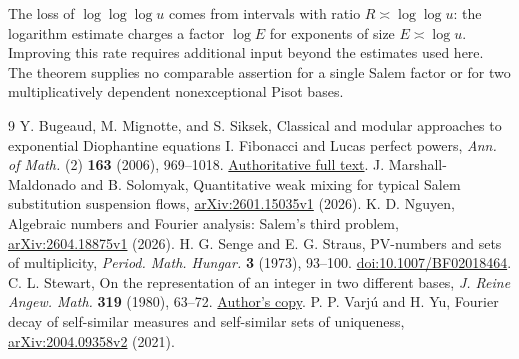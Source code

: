 \documentclass[11pt]{article}
\begin{document}
The loss of $\log\log\log u$ comes from intervals with ratio
$R\asymp\log\log u$: the logarithm estimate charges a factor
$\log E$ for exponents of size $E\asymp\log u$.
Improving this rate requires additional input beyond the estimates used
here. The theorem supplies no comparable assertion for a single Salem
factor or for two multiplicatively dependent nonexceptional Pisot bases.

\begin{thebibliography}{9}
 Y. Bugeaud, M. Mignotte, and S. Siksek,
Classical and modular approaches to exponential Diophantine equations I.
Fibonacci and Lucas perfect powers,
\emph{Ann. of Math.} (2) \textbf{163} (2006), 969--1018.
\href{https://annals.math.princeton.edu/wp-content/uploads/annals-v163-n3-p05.pdf}{Authoritative full text}.
 J. Marshall-Maldonado and B. Solomyak,
Quantitative weak mixing for typical Salem substitution suspension flows,
\href{https://arxiv.org/abs/2601.15035v1}{arXiv:2601.15035v1} (2026).
 K. D. Nguyen,
Algebraic numbers and Fourier analysis: Salem's third problem,
\href{https://arxiv.org/abs/2604.18875v1}{arXiv:2604.18875v1} (2026).
 H. G. Senge and E. G. Straus,
PV-numbers and sets of multiplicity,
\emph{Period. Math. Hungar.} \textbf{3} (1973), 93--100.
\href{https://doi.org/10.1007/BF02018464}{doi:10.1007/BF02018464}.
 C. L. Stewart,
On the representation of an integer in two different bases,
\emph{J. Reine Angew. Math.} \textbf{319} (1980), 63--72.
\href{https://uwaterloo.ca/pure-mathematics/sites/default/files/uploads/documents/j-reine-ange-math-1980.pdf}{Author's copy}.
 P. P. Varj\'u and H. Yu,
Fourier decay of self-similar measures and self-similar sets of uniqueness,
\href{https://arxiv.org/abs/2004.09358v2}{arXiv:2004.09358v2} (2021).
\end{thebibliography}
\end{document}
